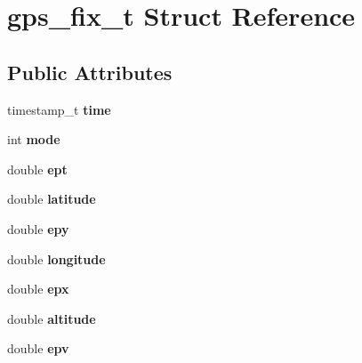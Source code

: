 \hypertarget{structgps__fix__t}{\section{gps\-\_\-fix\-\_\-t \-Struct \-Reference}
\label{structgps__fix__t}
}
\subsection*{\-Public \-Attributes}
\begin{DoxyCompactItemize}
\item 
\hypertarget{structgps__fix__t_ae738ea60d517cadf838f5a75398ffdca}{timestamp\-\_\-t {\bfseries time}}\label{structgps__fix__t_ae738ea60d517cadf838f5a75398ffdca}

\item 
\hypertarget{structgps__fix__t_a93bddf0ea0a88cf130f99d98fc0c809c}{int {\bfseries mode}}\label{structgps__fix__t_a93bddf0ea0a88cf130f99d98fc0c809c}

\item 
\hypertarget{structgps__fix__t_abf340b816129313dc8ee5bb49b8198c0}{double {\bfseries ept}}\label{structgps__fix__t_abf340b816129313dc8ee5bb49b8198c0}

\item 
\hypertarget{structgps__fix__t_af024e27ab1b3929d50ab41042b7fb9e7}{double {\bfseries latitude}}\label{structgps__fix__t_af024e27ab1b3929d50ab41042b7fb9e7}

\item 
\hypertarget{structgps__fix__t_a60d9a846df697e7d1f7d5c96e7220990}{double {\bfseries epy}}\label{structgps__fix__t_a60d9a846df697e7d1f7d5c96e7220990}

\item 
\hypertarget{structgps__fix__t_a05f8d352a260c8e03c26d00d1694b433}{double {\bfseries longitude}}\label{structgps__fix__t_a05f8d352a260c8e03c26d00d1694b433}

\item 
\hypertarget{structgps__fix__t_a37177366e17069b54b3103e322221855}{double {\bfseries epx}}\label{structgps__fix__t_a37177366e17069b54b3103e322221855}

\item 
\hypertarget{structgps__fix__t_a16115a83745fb2654d01210c7098c543}{double {\bfseries altitude}}\label{structgps__fix__t_a16115a83745fb2654d01210c7098c543}

\item 
\hypertarget{structgps__fix__t_a52d6c935127ccdce3430446971f02082}{double {\bfseries epv}}\label{structgps__fix__t_a52d6c935127ccdce3430446971f02082}


\end{DoxyCompactItemize}
